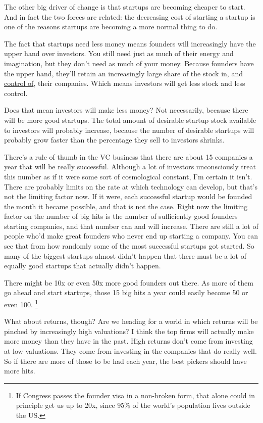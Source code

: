 The other big driver of change is that startups are becoming cheaper to
start. And in fact the two forces are related: the decreasing cost of
starting a startup is one of the reasons startups are becoming a more
normal thing to do.

The fact that startups need less money means founders will increasingly
have the upper hand over investors. You still need just as much of their
energy and imagination, but they don't need as much of your money.
Because founders have the upper hand, they'll retain an increasingly
large share of the stock in, and \href{control.html}{control of}, their
companies. Which means investors will get less stock and less control.

Does that mean investors will make less money? Not necessarily, because
there will be more good startups. The total amount of desirable startup
stock available to investors will probably increase, because the number
of desirable startups will probably grow faster than the percentage they
sell to investors shrinks.

There's a rule of thumb in the VC business that there are about 15
companies a year that will be really successful. Although a lot of
investors unconsciously treat this number as if it were some sort of
cosmological constant, I'm certain it isn't. There are probably limits
on the rate at which technology can develop, but that's not the limiting
factor now. If it were, each successful startup would be founded the
month it became possible, and that is not the case. Right now the
limiting factor on the number of big hits is the number of sufficiently
good founders starting companies, and that number can and will increase.
There are still a lot of people who'd make great founders who never end
up starting a company. You can see that from how randomly some of the
most successful startups got started. So many of the biggest startups
almost didn't happen that there must be a lot of equally good startups
that actually didn't happen.

There might be 10x or even 50x more good founders out there. As more of
them go ahead and start startups, those 15 big hits a year could easily
become 50 or even 100. \footnote{If Congress passes the \href{foundervisa.html}{founder visa} in
a non-broken form, that alone could in principle get us up to 20x, since
95\% of the world's population lives outside the US.}

What about returns, though? Are we heading for a world in which returns
will be pinched by increasingly high valuations? I think the top firms
will actually make more money than they have in the past. High returns
don't come from investing at low valuations. They come from investing in
the companies that do really well. So if there are more of those to be
had each year, the best pickers should have more hits.

